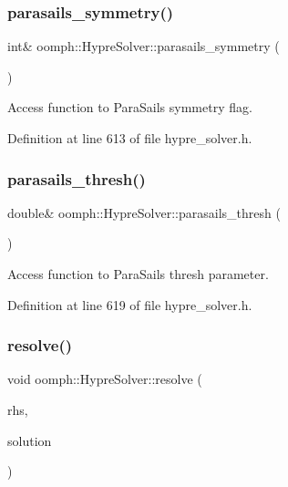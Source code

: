 \subsubsection{\texorpdfstring{parasails\+\_\+symmetry()}{parasails\_symmetry()}}
{\footnotesize\ttfamily int\& oomph\+::\+Hypre\+Solver\+::parasails\+\_\+symmetry (\begin{DoxyParamCaption}{ }\end{DoxyParamCaption})\hspace{0.3cm}{\ttfamily [inline]}}



Access function to Para\+Sails symmetry flag. 



Definition at line 613 of file hypre\+\_\+solver.\+h.

\mbox{\label{classoomph_1_1HypreSolver_a64bfb100909ce50177f3433b2df83c65}} 
\subsubsection{\texorpdfstring{parasails\+\_\+thresh()}{parasails\_thresh()}}
{\footnotesize\ttfamily double\& oomph\+::\+Hypre\+Solver\+::parasails\+\_\+thresh (\begin{DoxyParamCaption}{ }\end{DoxyParamCaption})\hspace{0.3cm}{\ttfamily [inline]}}



Access function to Para\+Sails thresh parameter. 



Definition at line 619 of file hypre\+\_\+solver.\+h.

\mbox{\label{classoomph_1_1HypreSolver_a892df4a9377dfa5ec978a74badb61423}} 
\subsubsection{\texorpdfstring{resolve()}{resolve()}}
{\footnotesize\ttfamily void oomph\+::\+Hypre\+Solver\+::resolve (\begin{DoxyParamCaption}\item[{const \hyperlink{classoomph_1_1DoubleVector}{Double\+Vector} \&}]{rhs,  }\item[{\hyperlink{classoomph_1_1DoubleVector}{Double\+Vector} \&}]{solution }\end{DoxyParamCaption})\hspace{0.3cm}{\ttfamily [virtual]}}




